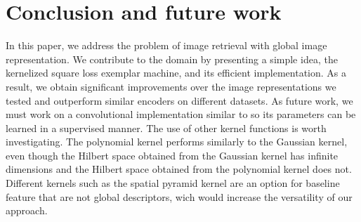 \section{Conclusion and future work}
\label{conclusion}
In this paper, we address the problem of image retrieval with global image representation. 
We contribute to the domain by presenting a simple idea, the kernelized square loss exemplar machine, and its efficient implementation.
As a result, we obtain significant improvements over the image representations we tested and outperform similar encoders on different datasets. 
As future work, we must work on a convolutional implementation similar to \cite{Arandjelovic15} so its parameters can be learned in a supervised manner.
The use of other kernel functions is worth investigating. The polynomial kernel performs similarly to the Gaussian kernel, even though the Hilbert space obtained from the Gaussian kernel has infinite dimensions and the Hilbert space obtained from the polynomial kernel does not. Different kernels such as the spatial pyramid kernel \cite{spk} are an option for baseline feature that are not global descriptors, wich would increase the versatility of our approach.



